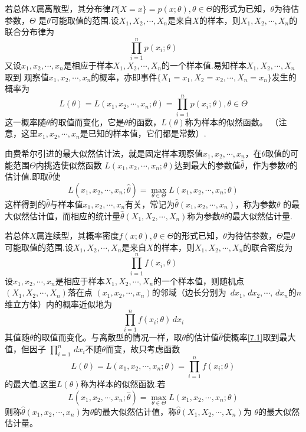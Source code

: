 \begin{definition}[最大似然估计法]
    若总体$X$属离散型，其分布律$P\{X=x\}=p(x;\theta),\theta\in \varTheta$的形式为已知，$\theta$为待估参数，$\varTheta$
    是$\theta$可能取值的范围.设$X_1,X_2,\cdots,X_n$是来自$X$的样本，则$X_1,X_2,\cdots,X_n$的联合分布律为
    $$\prod_{i=1}^np(x_i;\theta)$$
    又设$x_1,x_2,\cdots,x_n$是相应于样本$X_1,X_2,\cdots,X_n$的一个样本值.易知样本$X_1,X_2,\cdots,X_n$取到
    观察值$x_1,x_2,\cdots,x_n$的概率，亦即事件$\{X_1=x_1,X_2=x_2,\cdots,X_n=x_n\}$发生的概率为
    $$L(\theta)=L(x_1,x_2,\cdots,x_n;\theta)=\prod_{i=1}^np(x_i;\theta),\theta\in\varTheta$$
    这一概率随$\theta$的取值而变化，它是$\theta$的函数，$L(\theta)$称为样本的{\heiti 似然函数}。
    （注意，这里$x_1,x_2,\cdots,x_n$是已知的样本值，它们都是常数）.

    由费希尔引进的最大似然估计法，就是固定样本观察值$x_1,x_2,\cdots,x_n$，在$\theta$取值的可能范围$\varTheta$内挑选使似然函数
    $L(x_1,x_2,\cdots,x_n;\theta)$达到最大的参数值$\hat{\theta}$，作为参数$\theta$的估计值.即取$\hat{\theta}$使
    $$L(x_1,x_2,\cdots,x_n;\hat{\theta})=\max\limits_{\theta\in\varTheta}L(x_1,x_2,\cdots,x_n;\theta)$$
    这样得到的$\hat{\theta}$与样本值$x_1,x_2,\cdots,x_n$有关，常记为$\hat{\theta}(x_1,x_2,\cdots,x_n)$，称为参数$\theta$
    的{\heiti 最大似然估计值}，而相应的统计量$\hat{\theta}(X_1,X_2,\cdots,X_n)$称为参数$\theta$的{\heiti 最大似然估计量}.

    若总体$X$属连续型，其概率密度$f(x;\theta),\theta\in\varTheta$的形式已知，$\theta$为待估参数，$\varTheta$是$\theta$
    可能取值的范围.设$X_1,X_2,\cdots,X_n$是来自$X$的样本，则$X_1,X_2,\cdots,X_n$的联合密度为
    $$\prod_{i=1}^nf(x_i,\theta)$$
    设$x_1,x_2,\cdots,x_n$是相应于样本$X_1,X_2,\cdots,X_n$的一个样本值，则随机点$(X_1,X_2,\cdots,X_n)$落在点
    $(x_1,x_2,\cdots,x_n)$的邻域（边长分别为    $\,dx_1,\,dx_2,\cdots,\,dx_n$的$n$维立方体）内的概率近似地为
    \begin{equation}\tag{1}\label{7.1}
    \prod_{i=1}^nf(x_i;\theta)\,dx_i
    \end{equation}
    其值随$\theta$的取值而变化。与离散型的情况一样，取$\theta$的估计值$\hat{\theta}$使概率\eqref{7.1}取到最大值，但因子
    $\displaystyle{\prod_{i=1}^n\,dx_i}$不随$\theta$而变，故只考虑函数
    $$L(\theta)=L(x_1,x_2,\cdots,x_n;\theta)=\prod_{i=1}^nf(x_i;\theta)$$
    的最大值.这里$L(\theta)$称为样本的{\heiti 似然函数}.若
    $$L(x_1,x_2,\cdots,x_n;\hat{\theta})=\max\limits_{\theta\in \varTheta}L(x_1,x_2,\cdots,x_n;\theta)$$
    则称$\hat{\theta}(x_1,x_2,\cdots,x_n)$为$\theta$的{\heiti 最大似然估计值}，称$\hat{\theta}(X_1,X_2,\cdots,X_n)$为
    $\theta$的{\heiti 最大似然估计量}。
    

\end{definition}
